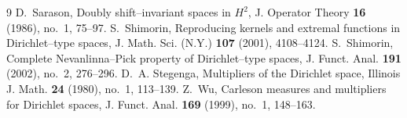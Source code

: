 \documentclass[12pt,reqno,a4paper]{amsart}
\numberwithin{equation}{section}
\begin{document}
\begin{thebibliography}{9}
		D.~Sarason,
		Doubly shift--invariant spaces in $H^2$, J. Operator Theory \textbf{16} (1986), no.~1, 75--97.
		S.~Shimorin,
		Reproducing kernels and extremal functions in Dirichlet--type spaces, J. Math. Sci. (N.Y.) \textbf{107} (2001), 4108--4124.
		S.~Shimorin,
		Complete Nevanlinna--Pick property of Dirichlet--type spaces, J. Funct. Anal. \textbf{191}
		(2002), no.~2, 276--296.
		D.~A. Stegenga,
		Multipliers of the Dirichlet space, Illinois J. Math. \textbf{24} (1980), no.~1, 113--139.
		Z.~Wu,
		Carleson measures and multipliers for Dirichlet spaces, J. Funct. Anal. \textbf{169} (1999), no.~1, 148--163.
	\end{thebibliography}
\end{document}

